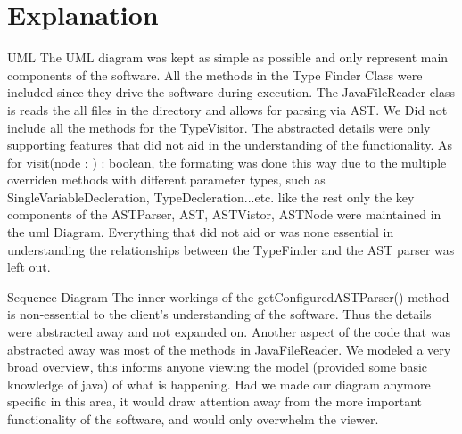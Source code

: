 \documentclass[12p]{article}
\begin{document}
\section{Explanation}

UML 
The UML diagram was kept as simple as possible and only represent main components of the software. All the methods in the Type Finder Class were included since they drive the software during execution. The JavaFileReader class is reads the all files in the directory and allows for parsing via AST. We Did not include all the methods for the TypeVisitor. The abstracted details were only supporting features that did not aid in the understanding of the functionality. As for visit(node : ) : boolean, the formating was done this way due to the multiple overriden methods with different parameter types, such as SingleVariableDecleration, TypeDecleration...etc. 
like the rest only the key components of  the ASTParser, AST, ASTVistor, ASTNode were maintained in the uml Diagram. Everything that did not aid or was none essential in understanding the relationships between the TypeFinder and the AST parser was left out. 

Sequence Diagram
The inner workings of the getConfiguredASTParser() method is non-essential to the client's understanding of the software. Thus the details were abstracted away and not expanded on. Another aspect of the code that was abstracted away was most of the methods in JavaFileReader. We modeled a very broad overview, this informs anyone viewing the model (provided some basic knowledge of java) of what is happening. Had we made our diagram anymore specific in this area, it would draw attention away from the more important functionality of the software, and would only overwhelm the viewer.
\end{document}
